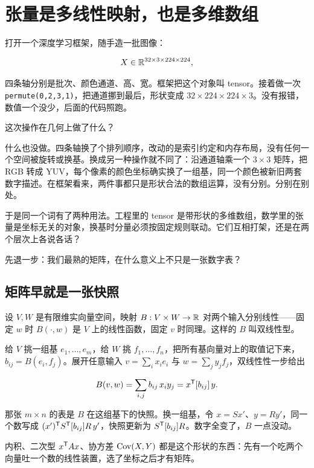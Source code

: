 \section{张量是多线性映射，也是多维数组}
\label{sec:03-Linear-Algebra/09-Tensors/01}

打开一个深度学习框架，随手造一批图像：

\[
X\in\mathbb{R}^{32\times 3\times 224\times 224},
\]

四条轴分别是批次、颜色通道、高、宽。框架把这个对象叫 tensor。接着做一次 \texttt{permute(0,2,3,1)}，把通道挪到最后，形状变成 \(32\times224\times224\times3\)。没有报错，数值一个没少，后面的代码照跑。

这次操作在几何上做了什么？

什么也没做。四条轴换了个排列顺序，改动的是索引约定和内存布局，没有任何一个空间被旋转或换基。换成另一种操作就不同了：沿通道轴乘一个 \(3\times3\) 矩阵，把 RGB 转成 YUV，每个像素的颜色坐标确实换了一组基，同一个颜色被新旧两套数字描述。在框架看来，两件事都只是形状合法的数组运算，没有分别。分别在别处。

于是同一个词有了两种用法。工程里的 tensor 是带形状的多维数组，数学里的张量是坐标无关的对象，换基时分量必须按固定规则联动。它们互相打架，还是在两个层次上各说各话？

先退一步：我们最熟的矩阵，在什么意义上不只是一张数字表？

\subsection{矩阵早就是一张快照}

设 \(V,W\) 是有限维实向量空间，映射 \(B:V\times W\to\mathbb{R}\) 对两个输入分别线性——固定 \(w\) 时 \(B(\cdot,w)\) 是 \(V\) 上的线性函数，固定 \(v\) 时同理。这样的 \(B\) 叫双线性型。

给 \(V\) 挑一组基 \(e_1,\dots,e_m\)，给 \(W\) 挑 \(f_1,\dots,f_n\)，把所有基向量对上的取值记下来，\(b_{ij}=B(e_i,f_j)\)。展开任意输入 \(v=\sum_i x_ie_i\) 与 \(w=\sum_j y_jf_j\)，双线性性一步给出

\[
B(v,w)=\sum_{i,j}b_{ij}\,x_iy_j=x^{\mathsf{T}}[b_{ij}]\,y .
\]

那张 \(m\times n\) 的表是 \(B\) 在这组基下的快照。换一组基，令 \(x=Sx'\)、\(y=Ry'\)，同一个数写成 \((x')^{\mathsf{T}}S^{\mathsf{T}}[b_{ij}]R\,y'\)，快照更新为 \(S^{\mathsf{T}}[b_{ij}]R\)。数字全变了，\(B\) 一点没动。

内积、二次型 \(x^{\mathsf{T}}Ax\)、协方差 \(\operatorname{Cov}(X,Y)\) 都是这个形状的东西：先有一个吃两个向量吐一个数的线性装置，选了坐标之后才有矩阵。

